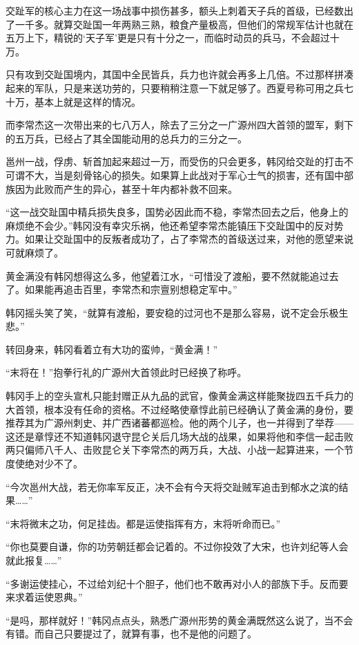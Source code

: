 交趾军的核心主力在这一场战事中损伤甚多，额头上刺着天子兵的首级，已经数出了一千多。就算交趾国一年两熟三熟，粮食产量极高，但他们的常规军估计也就在五万上下，精锐的‘天子军’更是只有十分之一，而临时动员的兵马，不会超过十万。

只有攻到交趾国境内，其国中全民皆兵，兵力也许就会再多上几倍。不过那样拼凑起来的军队，只是来送功劳的，只要稍稍注意一下就足够了。西夏号称可用之兵七十万，基本上就是这样的情况。

而李常杰这一次带出来的七八万人，除去了三分之一广源州四大首领的盟军，剩下的五万兵，已经占了其全国能动用的总兵力的三分之一。

邕州一战，俘虏、斩首加起来超过一万，而受伤的只会更多，韩冈给交趾的打击不可谓不大，当是刻骨铭心的损失。如果算上此战对于军心士气的损害，还有国中部族因为此败而产生的异心，甚至十年内都补救不回来。

“这一战交趾国中精兵损失良多，国势必因此而不稳，李常杰回去之后，他身上的麻烦绝不会少。”韩冈没有幸灾乐祸，他还希望李常杰能镇压下交趾国中的反对势力。如果让交趾国中的反叛者成功了，占了李常杰的首级送过来，对他的愿望来说可就麻烦了。

黄金满没有韩冈想得这么多，他望着江水，“可惜没了渡船，要不然就能追过去了。如果能再追击百里，李常杰和宗亶别想稳定军中。”

韩冈摇头笑了笑，“就算有渡船，要安稳的过河也不是那么容易，说不定会乐极生悲。”

转回身来，韩冈看着立有大功的蛮帅，“黄金满！”

“末将在！”抱拳行礼的广源州大首领此时已经换了称呼。

韩冈手上的空头宣札只能封赠正从九品的武官，像黄金满这样能聚拢四五千兵力的大首领，根本没有任命的资格。不过经略使章惇此前已经确认了黄金满的身份，要推荐其为广源州刺史、并广西诸蕃都巡检。他的两个儿子，也一并得到了举荐——这还是章惇还不知道韩冈退守昆仑关后几场大战的战果，如果将他和李信一起击败两只偏师八千人、击败昆仑关下李常杰的两万兵，大战、小战一起算进来，一个节度使绝对少不了。

“今次邕州大战，若无你率军反正，决不会有今天将交趾贼军追击到郁水之滨的结果……”

“末将微末之功，何足挂齿。都是运使指挥有方，末将听命而已。”

“你也莫要自谦，你的功劳朝廷都会记着的。不过你投效了大宋，也许刘纪等人会就此报复……”

“多谢运使挂心，不过给刘纪十个胆子，他们也不敢再对小人的部族下手。反而要来求着运使恩典。”

“是吗，那样就好！”韩冈点点头，熟悉广源州形势的黄金满既然这么说了，当不会有错。而自己只要提过了，就算有事，也不是他的问题了。

